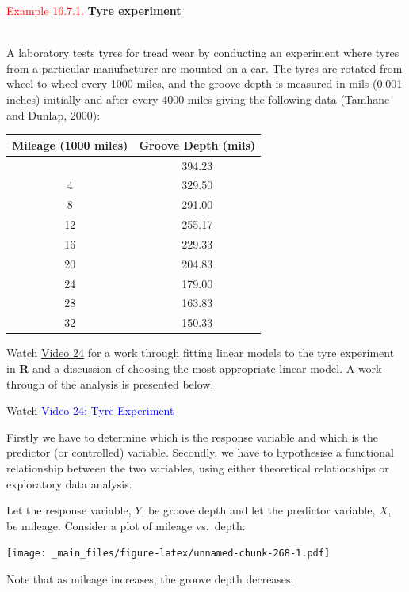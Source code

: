 \documentclass[
]{book}
\begin{document}
\leavevmode{}%
\textcolor{red}{Example 16.7.1.}
{\textbf{Tyre experiment}}\\
\strut \\
A laboratory tests tyres for tread wear by conducting an experiment where tyres from a particular manufacturer are mounted on a car. The tyres are rotated from wheel to wheel every 1000 miles, and the groove depth is measured in mils (0.001 inches) initially and after every 4000 miles giving the following data (Tamhane and Dunlap, 2000):

\begin{longtable}[]{@{}cc@{}}
\toprule\noalign{}
Mileage (1000 miles) & Groove Depth (mils) \\
\midrule\noalign{}
\endhead
\bottomrule\noalign{}
\endlastfoot
0 & 394.23 \\
4 & 329.50 \\
8 & 291.00 \\
12 & 255.17 \\
16 & 229.33 \\
20 & 204.83 \\
24 & 179.00 \\
28 & 163.83 \\
32 & 150.33 \\
\end{longtable}

Watch \protect\hyperlink{video24}{Video 24} for a work through fitting linear models to the tyre experiment in \textbf{R} and a discussion of choosing the most appropriate linear model. A work through of the analysis is presented below.

Watch \href{https://mediaspace.nottingham.ac.uk/media/Tyre+Experiment+FINAL+VERSION/1_scmp85zy}{\textcolor{blue}{Video 24: Tyre Experiment}}

Firstly we have to determine which is the response variable and which is the predictor (or controlled) variable. Secondly, we have to hypothesise a functional relationship between the two variables, using either
theoretical relationships or exploratory data analysis.

Let the response variable, \(Y\), be groove depth and let the predictor variable, \(X\), be mileage. Consider a plot of mileage vs.~depth:

\texttt{[image: \_main\_files/figure-latex/unnamed-chunk-268-1.pdf]}

\hfill\break

Note that as mileage increases, the groove depth decreases.
\end{document}
